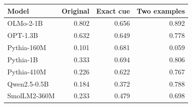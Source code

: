\begin{tabular}{@{}lrrr@{}}
\toprule
Model & Original & Exact cue & Two examples \\
\midrule
OLMo-2-1B & 0.802 & 0.656 & 0.892 \\
OPT-1.3B & 0.632 & 0.649 & 0.778 \\
Pythia-160M & 0.101 & 0.681 & 0.059 \\
Pythia-1B & 0.333 & 0.694 & 0.806 \\
Pythia-410M & 0.226 & 0.622 & 0.767 \\
Qwen2.5-0.5B & 0.184 & 0.372 & 0.788 \\
SmolLM2-360M & 0.233 & 0.479 & 0.698 \\
\bottomrule
\end{tabular}

